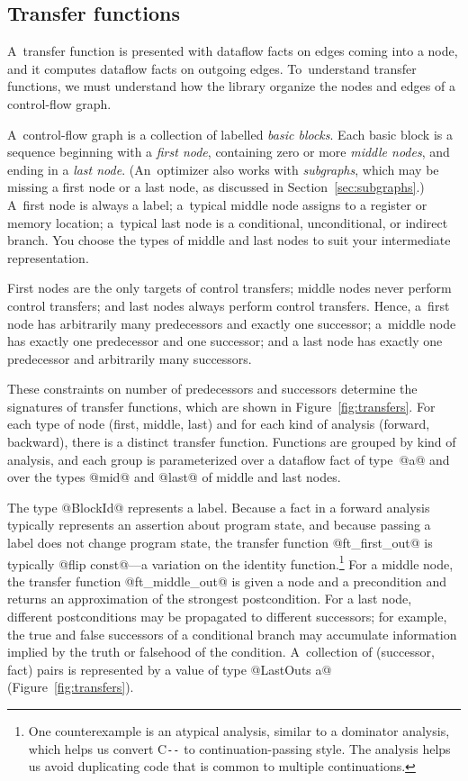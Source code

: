 \documentclass[blockstyle,preprint,natbib,nocopyrightspace]{sigplanconf}
\newcommand\PAL{\mbox{C{\texttt{-{}-}}}}
\newcommand\secref[1]{Section~\ref{sec:#1}}
\newcommand\seclabel[1]{\label{sec:#1}}
\newcommand\figref[1]{Figure~\ref{fig:#1}}
\begin{document}
\subsection{Transfer functions} \seclabel{tffuns}

A~transfer function is presented with dataflow facts on edges coming
into a node, and it computes dataflow facts on outgoing edges.
To~understand transfer functions, we must 
understand how the library organize the nodes and edges of a control-flow graph.

\seclabel{graph.intro}

A~control-flow graph is a collection of labelled \emph{basic blocks}.
Each basic block is a sequence beginning with a \emph{first node},
containing zero or more \emph{middle nodes},
and ending in a \emph{last node}.
(An~optimizer also works with \emph{subgraphs}, which may be missing a
first node or a last node, as discussed in \secref{subgraphs}.)
A~first node is always a label;
a~typical middle node assigns to a register or memory
location;
a~typical last node is a conditional, unconditional, or indirect branch.
You choose the types of middle and last nodes to suit your
intermediate representation.




First nodes are the only targets of control transfers;
middle nodes never perform control transfers;
and
last nodes always perform control transfers.
Hence, a~first node has arbitrarily many predecessors and exactly one
successor;
a~middle node has exactly one predecessor and one successor;
and a last node has exactly one predecessor and arbitrarily many
successors. 

These constraints on number of predecessors and successors determine
the signatures of 
transfer functions, 
which are shown in \figref{transfers}.
For each type of node (first, middle, last) and for each kind of
analysis (forward, backward), there is a distinct transfer function.
Functions are grouped by kind of analysis, and each group is
parameterized over a dataflow fact of type~@a@ and over the types
@mid@ and @last@ of middle and last nodes.  


The type @BlockId@ represents a label.
Because a fact in a forward analysis typically represents an assertion
about program state,
 and because passing a label does not change
program state, the transfer function @ft_first_out@ is typically 
@flip const@---a variation on
the
identity function.\footnote
{One counterexample is an atypical
analysis, similar to a dominator analysis,
which helps us convert {\PAL} to continuation-passing style.
The  analysis
helps us avoid duplicating code that is common to multiple continuations.
}
For a middle node, the transfer function @ft_middle_out@ is given a
node and a precondition and returns an approximation of the strongest
postcondition. 
For a last node, different postconditions may be propagated to
different successors; for example, the true and false successors of a
conditional branch may accumulate information implied by the truth or
falsehood of the condition.
A~collection of (successor, fact) pairs is represented by a value of
type @LastOuts a@ (\figref{transfers}).
\end{document}
